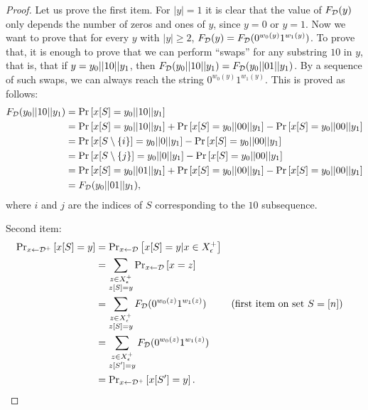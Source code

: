 \begin{proof}
   Let us prove the first item. For $|y| = 1$ it is clear that
   the value of $F_{\mathcal{D}}(y)$ only depends the number of zeros and ones of $y$, since
   $y = 0$ or $y = 1$.  Now we want to prove that for every $y$ with $|y| \geq 2$,
   $F_{\mathcal{D}}(y) = F_{\mathcal{D}}(0^{w_0(y)}1^{w_1(y)})$. To prove that, it is enough to prove that we
   can perform ``swaps'' for any substring $10$ in $y$, that is, that if $y = y_0 || 10 || y_1$,
   then $F_{\mathcal{D}}(y_0 || 10 || y_1) = F_{\mathcal{D}}(y_0 || 01 || y_1)$. By a sequence of such swaps, we can always reach the 
   string $0^{w_0(y)}1^{w_1(y)}$. This is proved as follows:  
   \begin{align*}
   F_{\mathcal{D}}(y_0 || 10 || y_1) & = \text{Pr}\left[x[S] = y_0 || 10 || y_1\right] \\
                                    & = \text{Pr}\left[x[S] = y_0 || 10 || y_1\right] 
                                    + \text{Pr}\left[x[S] = y_0 || 00 || y_1\right]
                                    - \text{Pr}\left[x[S] = y_0 || 00 || y_1\right] \\
                                    & = \text{Pr}\left[x[S \setminus \{i\}] = y_0 || 0 || y_1\right]
                                    - \text{Pr}\left[x[S] = y_0 || 00 || y_1\right] \\
                                    & = \text{Pr}\left[x[S \setminus \{j\}] = y_0 || 0 || y_1\right]
                                    - \text{Pr}\left[x[S] = y_0 || 00 || y_1\right] \\
                                    & = \text{Pr}\left[x[S] = y_0 || 01 || y_1\right] 
                                    + \text{Pr}\left[x[S] = y_0 || 00 || y_1\right]
                                    - \text{Pr}\left[x[S] = y_0 || 00 || y_1\right] \\
                                    & = F_{\mathcal{D}}(y_0 || 01 || y_1),
   \end{align*}
   where $i$ and $j$ are the indices of $S$ corresponding to the $10$ subsequence. 

Second item:
\begin{align*}
    \text{Pr}_{x \leftarrow \mathcal{D}^+}\left[x[S] = y\right] & = \text{Pr}_{x \leftarrow \mathcal{D}}\left[x[S] = y | x \in X^+_\epsilon\right] \\
        & = \sum_{\substack{z\in X^+_\epsilon \\ z[S] = y}} \text{Pr}_{x \leftarrow \mathcal{D}}\left[x = z\right] \\
        & = \sum_{\substack{z\in X^+_\epsilon \\ z[S] = y}} F_{\mathcal{D}}(0^{w_0(z)}1^{w_1(z)})
        && (\text{first item on set } S = [n])\\
        & = \sum_{\substack{z\in X^+_\epsilon \\ z[S'] = y}} F_{\mathcal{D}}(0^{w_0(z)} 1^{w_1(z)}) \\
        & = \text{Pr}_{x \leftarrow \mathcal{D}^+}\left[x[S'] = y\right].
\end{align*}


\end{proof}
